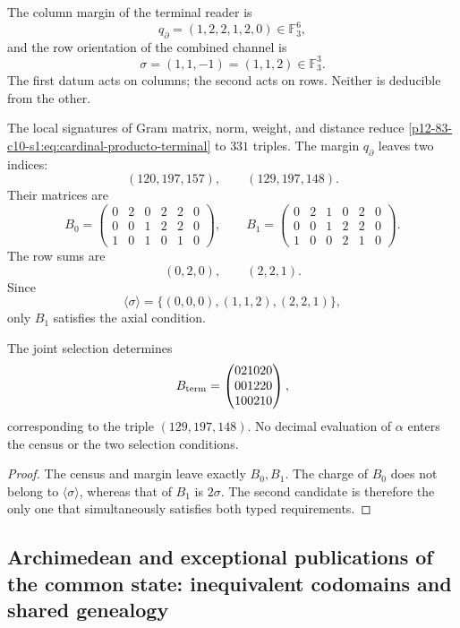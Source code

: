 The column margin of the terminal reader is
\[
 q_\partial=(1,2,2,1,2,0)\in\mathbb F_3^6,
\]
and the row orientation of the combined channel is
\[
 \sigma=(1,1,-1)=(1,1,2)\in\mathbb F_3^3.
\]
The first datum acts on columns; the second acts on rows. Neither is deducible from the other.

The local signatures of Gram matrix, norm, weight, and distance reduce
\eqref{p12-83-c10-s1:eq:cardinal-producto-terminal} to \(331\) triples. The margin
\(q_\partial\) leaves two indices:
\[
 (120,197,157),
 \qquad
 (129,197,148).
\]
Their matrices are
\[
 B_0=
 \begin{pmatrix}
 0&2&0&2&2&0\\
 0&0&1&2&2&0\\
 1&0&1&0&1&0
 \end{pmatrix},
 \qquad
 B_1=
 \begin{pmatrix}
 0&2&1&0&2&0\\
 0&0&1&2&2&0\\
 1&0&0&2&1&0
 \end{pmatrix}.
\]
The row sums are
\[
 (0,2,0),
 \qquad
 (2,2,1).
\]
Since
\[
 \langle\sigma\rangle
 =\{(0,0,0),(1,1,2),(2,2,1)\},
\]
only \(B_1\) satisfies the axial condition.

\begin{theorem}
\label{p12-83-c10-s1:thm:unicidad-publicacion-terminal-visible}
The joint selection determines
\begin{equation}
 B_{\rm term}=
 \begin{pmatrix}
 021020\\001220\\100210
 \end{pmatrix},
 \label{p12-83-c10-s1:eq:matriz-terminal-visible}
\end{equation}
corresponding to the triple \((129,197,148)\). No decimal evaluation of
\(\alpha\) enters the census or the two selection conditions.
\end{theorem}

\begin{proof}
The census and margin leave exactly \(B_0,B_1\). The charge of \(B_0\)
does not belong to \(\langle\sigma\rangle\), whereas that of \(B_1\) is
\(2\sigma\). The second candidate is therefore the only one that simultaneously satisfies
both typed requirements.
\end{proof}

\subsection{Archimedean and exceptional publications of the common state: inequivalent codomains and shared genealogy}

